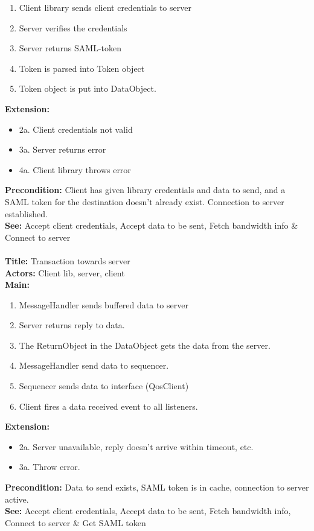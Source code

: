 		\begin{enumerate}
			\item Client library sends client credentials to server
			\item Server verifies the credentials
			\item Server returns SAML-token
			\item Token is parsed into Token object
			\item Token object is put into DataObject.
		\end{enumerate}
		\textbf{Extension:}
		\begin{itemize}
			  \item 2a. Client credentials not valid
			  \item 3a. Server returns error
			  \item 4a. Client library throws error
		\end{itemize}
		\textbf{Precondition:} Client has given library credentials and data to send, and a SAML token for the destination doesn’t already exist. Connection to server established. \\
		\textbf{See:} Accept client credentials, Accept data to be sent, Fetch bandwidth info & Connect to server
		\\\\
		\textbf{Title:} Transaction towards server \\
		\textbf{Actors:} Client lib, server, client \\
		\textbf{Main:}
		\begin{enumerate}
			\item MessageHandler sends buffered data to server
			\item Server returns reply to data.
			\item The ReturnObject in the DataObject gets the data from the server.
			\item MessageHandler send data to sequencer.
			\item Sequencer sends data to interface (QosClient)
			\item Client fires a data received event to all listeners.
		\end{enumerate}
		\textbf{Extension:}
		\begin{itemize}
			 \item[] 2a. Server unavailable, reply doesn’t arrive within timeout, etc.
			 \item[] 3a. Throw error.
		\end{itemize}
		\textbf{Precondition:} Data to send exists, SAML token is in cache, connection to server active.\\
		\textbf{See:} Accept client credentials, Accept data to be sent, Fetch bandwidth info, Connect to server & Get SAML token
		
